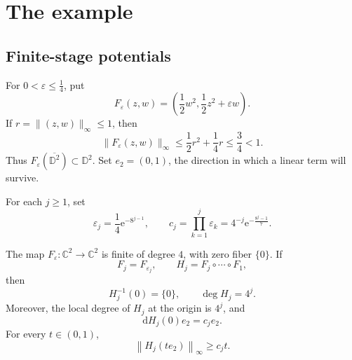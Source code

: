 \documentclass[11pt,a4paper]{article}
\newcommand{\e}{\mathrm e}
\begin{document}
\section{The example}\label{sec:ex}

\subsection{Finite-stage potentials}

For $0<\varepsilon\le\frac{1}{4}$, put
\[
  F_\varepsilon(z,w)
  =\left(\frac{1}{2}w^2,\frac{1}{2}z^2+\varepsilon w\right).
\]
If $r=\|(z,w)\|_\infty\le1$, then
\[
  \|F_\varepsilon(z,w)\|_\infty \le\frac{1}{2}r^2+\frac{1}{4}r \le\frac{3}{4}<1.
\]
Thus $F_\varepsilon(\overline{\mathbb D^2})\subset\mathbb D^2$.
Set $e_2=(0,1)$, the direction in which a linear term will survive.

For each $j\ge1$, set
\[
  \varepsilon_j=\frac{1}{4}\e^{-8^{j-1}},
  \qquad
  c_j=\prod_{k=1}^j\varepsilon_k=4^{-j}\e^{-\frac{8^j-1}{7}}.
\]

\begin{lemma}\label{lem:algebra}
The map $F_\varepsilon\colon\mathbb C^2\to\mathbb C^2$ is finite of degree $4$, with zero fiber $\{0\}$. If
\[
  F_j=F_{\varepsilon_j}, \qquad H_j=F_j\circ\cdots\circ F_1,
\]
then
\begin{equation}\label{eq:degree}
  H_j^{-1}(0)=\{0\},
  \qquad
  \deg H_j=4^j.
\end{equation}
Moreover, the local degree of $H_j$ at the origin is $4^j$, and
\begin{equation}\label{eq:linear}
  \mathrm dH_j(0)e_2=c_j e_2.
\end{equation}
For every $t\in(0,1)$,
\begin{equation}\label{eq:positive-axis}
  \left\|H_j(t e_2)\right\|_\infty\ge c_j t.
\end{equation}
\end{lemma}
\end{document}
